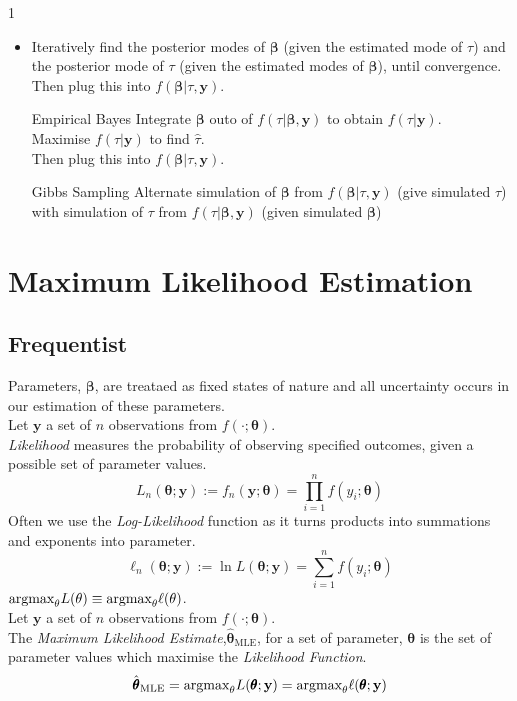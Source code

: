 \documentclass[11pt,a4paper]{article}
\begin{document}
1
\begin{itemize}
	\item Iteratively find the posterior modes of $\pmb\beta$ (given the estimated mode of $\tau$) and the posterior mode of $\tau$ (given the estimated modes of $\pmb\beta$), until convergence.\\
	Then plug this into $f(\pmb\beta|\tau,\textbf{y})$.
	\item[Empirical Bayes] Integrate $\pmb\beta$ outo of $f(\tau|\pmb\beta,\textbf{y})$ to obtain $f(\tau|\textbf{y})$.\\
	Maximise $f(\tau|\textbf{y})$ to find $\hat\tau$.\\
	Then plug this into $f(\pmb\beta|\tau,\textbf{y})$.
	\item[Gibbs Sampling] Alternate simulation of $\pmb\beta$ from $f(\pmb\beta|\tau,\textbf{y})$ (give simulated $\tau$) with simulation of $\tau$ from $f(\tau|\pmb\beta,\textbf{y})$ (given simulated $\pmb\beta$)
\end{itemize}

\section{Maximum Likelihood Estimation}

\subsection{Frequentist}

Parameters, $\pmb\beta$, are treataed as fixed states of nature and all uncertainty occurs in our estimation of these parameters.\\

Let $\textbf{y}$ a set of $n$ observations from $f(\cdot;\pmb\theta)$.\\
\textit{Likelihood} measures the probability of observing specified outcomes, given a possible set of parameter values.
$$L_n(\pmb\theta;\textbf{y}):=f_n(\textbf{y};\pmb\theta)=\prod_{i=1}^nf(y_i;\pmb\theta)$$
Often we use the \textit{Log-Likelihood} function as it turns products into summations and exponents into parameter.
$$\ell_n(\pmb\theta;\textbf{y}):=\ln L(\pmb\theta;\textbf{y})=\sum_{i=1}^nf(y_i;\pmb\theta)$$
\nb $\text{argmax}_\theta L(\theta)\equiv\text{argmax}_\theta \ell(\theta)$.\\

Let $\textbf{y}$ a set of $n$ observations from $f(\cdot;\pmb\theta)$.\\
The \textit{Maximum Likelihood Estimate},$\hat{\pmb\theta}_\text{MLE}$, for a set of parameter, $\pmb\theta$ is the set of parameter values which maximise the \textit{Likelihood Function}.
$$\hat{\pmb\theta}_\text{MLE}=\text{argmax}_\theta L(\pmb\theta;\textbf{y})=\text{argmax}_\theta \ell(\pmb\theta;\textbf{y})$$
\end{document}
